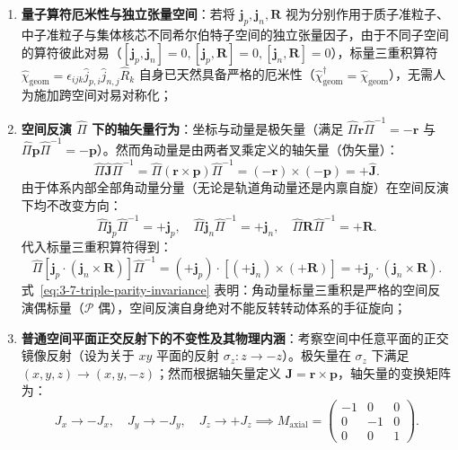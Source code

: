 \begin{enumerate}
\item \textbf{量子算符厄米性与独立张量空间}：若将 $\mathbf{j}_p, \mathbf{j}_n, \mathbf{R}$ 视为分别作用于质子准粒子、中子准粒子与集体核芯不同希尔伯特子空间的独立张量因子，由于不同子空间的算符彼此对易（$[\mathbf{j}_p, \mathbf{j}_n] = 0, [\mathbf{j}_p, \mathbf{R}] = 0, [\mathbf{j}_n, \mathbf{R}] = 0$），标量三重积算符 $\hat{\chi}_{\text{geom}} = \epsilon_{ijk} \hat{j}_{p,i} \hat{j}_{n,j} \hat{R}_k$ 自身已天然具备严格的厄米性（$\hat{\chi}_{\text{geom}}^\dagger = \hat{\chi}_{\text{geom}}$），无需人为施加跨空间对易对称化；
\item \textbf{空间反演 $\hat{\Pi}$ 下的轴矢量行为}：坐标与动量是极矢量（满足 $\hat{\Pi} \mathbf{r} \hat{\Pi}^{-1} = -\mathbf{r}$ 与 $\hat{\Pi} \mathbf{p} \hat{\Pi}^{-1} = -\mathbf{p}$）。然而角动量是由两者叉乘定义的轴矢量（伪矢量）：
\begin{equation}\label{eq:3-7-L-parity}
\hat{\Pi} \hat{\mathbf{J}} \hat{\Pi}^{-1} = \hat{\Pi} (\mathbf{r} \times \mathbf{p}) \hat{\Pi}^{-1} = (-\mathbf{r}) \times (-\mathbf{p}) = + \hat{\mathbf{J}}.
\end{equation}
由于体系内部全部角动量分量（无论是轨道角动量还是内禀自旋）在空间反演下均不改变方向：
\begin{equation}\label{eq:3-7-components-parity}
\hat{\Pi} \mathbf{j}_p \hat{\Pi}^{-1} = +\mathbf{j}_p, \quad \hat{\Pi} \mathbf{j}_n \hat{\Pi}^{-1} = +\mathbf{j}_n, \quad \hat{\Pi} \mathbf{R} \hat{\Pi}^{-1} = +\mathbf{R}.
\end{equation}
代入标量三重积算符得到：
\begin{equation}\label{eq:3-7-triple-parity-invariance}
\hat{\Pi} \left[ \mathbf{j}_p \cdot (\mathbf{j}_n \times \mathbf{R}) \right] \hat{\Pi}^{-1} = (+\mathbf{j}_p) \cdot \left[ (+\mathbf{j}_n) \times (+\mathbf{R}) \right] = + \mathbf{j}_p \cdot (\mathbf{j}_n \times \mathbf{R}).
\end{equation}
式~\eqref{eq:3-7-triple-parity-invariance} 表明：角动量标量三重积是严格的空间反演偶标量（$\mathcal{P}$ 偶），空间反演自身绝对不能反转转动体系的手征旋向；
\item \textbf{普通空间平面正交反射下的不变性及其物理内涵}：考察空间中任意平面的正交镜像反射（设为关于 $xy$ 平面的反射 $\sigma_z: z \to -z$）。极矢量在 $\sigma_z$ 下满足 $(x, y, z) \to (x, y, -z)$；然而根据轴矢量定义 $\mathbf{J} = \mathbf{r} \times \mathbf{p}$，轴矢量的变换矩阵为：
\begin{equation}\label{eq:3-7-axial-reflection}
J_x \to -J_x, \quad J_y \to -J_y, \quad J_z \to +J_z \implies M_{\text{axial}} = \begin{pmatrix} -1 & 0 & 0 \\ 0 & -1 & 0 \\ 0 & 0 & 1 \end{pmatrix}.

\end{equation}
\end{enumerate}
